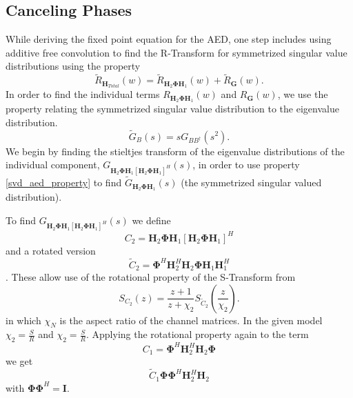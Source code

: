 \documentclass[12pt,a4paper]{report}
\begin{document}
\subsection{Canceling Phases}
While deriving the fixed point equation for the AED, one step includes using additive free convolution to find the R-Transform for symmetrized singular value distributions using the property 
\begin{equation}
\tilde{R}_{\mathbf{H}_{Total}}(w) = \tilde{R}_{\mathbf{H}_{2}\boldsymbol{\Phi}\mathbf{H}_{1}}(w) + \tilde{R}_{\mathbf{G}}(w).
\end{equation} In order to find the individual terms $R_{\mathbf{H}_{2}\boldsymbol{\Phi}\mathbf{H}_{1}}(w)$ and $R_{\mathbf{G}}(w)$, we use the property relating the symmetrized singular value distribution to the eigenvalue distribution.
\begin{equation}\label{svd_aed_property}
\tilde{G}_{B}(s) = sG_{BB^{\dagger}}(s^2).
\end{equation}
We begin by finding the stieltjes transform of the eigenvalue distributions of the individual component,
$G_{\mathbf{H}_{2}\boldsymbol{\Phi}\mathbf{H}_{1}[\mathbf{H}_{2}\boldsymbol{\Phi}\mathbf{H}_{1}]^H}(s)$, in order to use property \eqref{svd_aed_property} to find $\tilde{G}_{\mathbf{H}_{2}\boldsymbol{\Phi}\mathbf{H}_{1}}(s)$ (the symmetrized singular valued distribution).
\par
To find $G_{\mathbf{H}_{2}\boldsymbol{\Phi}\mathbf{H}_{1}[\mathbf{H}_{2}\boldsymbol{\Phi}\mathbf{H}_{1}]^H}(s)$ we define
\begin{equation}
C_2 = \mathbf{H}_{2}\boldsymbol{\Phi}\mathbf{H}_{1}[\mathbf{H}_{2}\boldsymbol{\Phi}\mathbf{H}_{1}]^H
\end{equation}
and a rotated version 
\begin{equation}
\tilde{C}_2 = \boldsymbol{\Phi}^H\mathbf{H}_{2}^H\mathbf{H}_{2}\boldsymbol{\Phi}\mathbf{H}_{1}\mathbf{H}_{1}^H
\end{equation}. 
These allow use of the rotational property of the S-Transform from \cite{muller2002asymptotic}
\begin{equation}\label{rotation_property}
S_{C_2}(z) = \frac{z+1}{z+\chi_2} S_{\tilde{C}_2}(\frac{z}{\chi_2}).
\end{equation}
in which $\chi_N$ is the aspect ratio of the channel matrices. In the given model $\chi_2 = \frac{S}{R}$ and
$\chi_2 = \frac{S}{R}$.
Applying the rotational property again to the term 
\begin{equation}
C_{1} = \boldsymbol{\Phi}^H\mathbf{H}_{2}^H\mathbf{H}_{2}\boldsymbol{\Phi}
\end{equation}
we get 
\begin{equation}
\tilde{C}_{1} \boldsymbol{\Phi}\boldsymbol{\Phi}^H\mathbf{H}_{2}^H\mathbf{H}_{2}
\end{equation}
with $\boldsymbol{\Phi}\boldsymbol{\Phi}^H = \mathbf{I}$.
\end{document}
